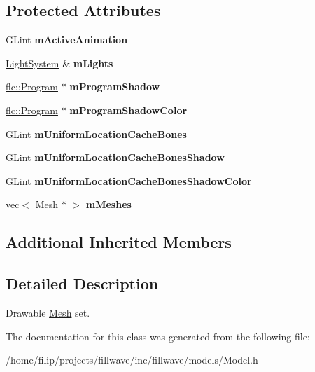 \subsection*{Protected Attributes}
\begin{DoxyCompactItemize}
\item 
\mbox{\label{classflw_1_1flf_1_1Model_a85e6d546b0e1224c8a7f36fc282a8a20}} 
G\+Lint {\bfseries m\+Active\+Animation}
\item 
\mbox{\label{classflw_1_1flf_1_1Model_a8017e514a989de4cb271cc4c5c8dc91b}} 
\hyperlink{classflw_1_1flf_1_1LightSystem}{Light\+System} \& {\bfseries m\+Lights}
\item 
\mbox{\label{classflw_1_1flf_1_1Model_afbb823836bab8841ccebae5c5f8dad5f}} 
\hyperlink{classflw_1_1flc_1_1Program}{flc\+::\+Program} $\ast$ {\bfseries m\+Program\+Shadow}
\item 
\mbox{\label{classflw_1_1flf_1_1Model_a8362a0a86e1a9b2c7ec8a2502492a51f}} 
\hyperlink{classflw_1_1flc_1_1Program}{flc\+::\+Program} $\ast$ {\bfseries m\+Program\+Shadow\+Color}
\item 
\mbox{\label{classflw_1_1flf_1_1Model_a5e363c4ac049d94802149faf08884e89}} 
G\+Lint {\bfseries m\+Uniform\+Location\+Cache\+Bones}
\item 
\mbox{\label{classflw_1_1flf_1_1Model_afb838c23faceb9fb81c0b52006ee0eca}} 
G\+Lint {\bfseries m\+Uniform\+Location\+Cache\+Bones\+Shadow}
\item 
\mbox{\label{classflw_1_1flf_1_1Model_a17d9e9f5ab171c3e65faf964618e3961}} 
G\+Lint {\bfseries m\+Uniform\+Location\+Cache\+Bones\+Shadow\+Color}
\item 
\mbox{\label{classflw_1_1flf_1_1Model_aadc87a312b20b06e8dd25e02048a72d9}} 
vec$<$ \hyperlink{classflw_1_1flf_1_1Mesh}{Mesh} $\ast$ $>$ {\bfseries m\+Meshes}
\end{DoxyCompactItemize}
\subsection*{Additional Inherited Members}


\subsection{Detailed Description}
Drawable \hyperlink{classflw_1_1flf_1_1Mesh}{Mesh} set. 

The documentation for this class was generated from the following file\+:\begin{DoxyCompactItemize}
\item 
/home/filip/projects/fillwave/inc/fillwave/models/Model.\+h\end{DoxyCompactItemize}

